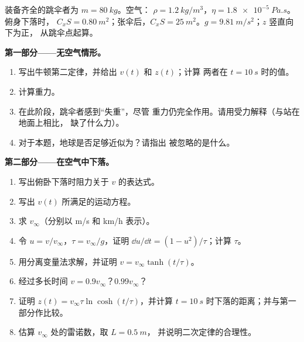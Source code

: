 \begin{problem}
\label{pb:b1:newton-dynamics:1}
装备齐全的跳伞者为 $m = \qty{80}{kg}$。空气：
$\rho = \qty{1.2}{kg/m^3}$，$\eta = \qty{1.8e-5}{Pa.s}$。俯身下落时，
$C_xS = \qty{0.80}{m^2}$；张伞后，$C_xS =
\qty{25}{m^2}$。$g = \qty{9.81}{m/s^2}$；$z$ 竖直向下为正，
从跳伞点起算。

\medskip
\noindent\textbf{第一部分——无空气情形。}
\begin{enumerate}
  \item 写出牛顿第二定律，并给出 $v(t)$ 和 $z(t)$；计算
        两者在 $t = \qty{10}{s}$ 时的值。
  \item 计算重力。
  \item 在此阶段，跳伞者感到“失重”，尽管
        重力仍完全作用。请用受力解释（与站在地面上相比，
        缺了什么力）。
  \item 对于本题，地球是否足够近似为？请指出
        被忽略的是什么。
\end{enumerate}

\medskip
\noindent\textbf{第二部分——在空气中下落。}
\begin{enumerate}[resume]
  \item 写出俯卧下落时阻力关于 $v$ 的表达式。
  \item 写出 $v(t)$ 所满足的运动方程。
  \item 求 $v_\infty$（分别以 \unit{m/s} 和
        \unit{km/h} 表示）。
  \item 令 $u = v/v_\infty$，$\tau = v_\infty/g$，证明
        $\dd u/\dd t = (1 - u^2)/\tau$；计算 $\tau$。
  \item 用分离变量法求解，并证明
        $v = v_\infty\tanh(t/\tau)$。
  \item 经过多长时间 $v = 0.9v_\infty$？$0.99v_\infty$？
  \item 证明 $z(t) = v_\infty\tau\ln\cosh(t/\tau)$，并计算
        $t = \qty{10}{s}$ 时下落的距离；并与第一部分作比较。
  \item 估算 $v_\infty$ 处的雷诺数，取 $L = \qty{0.5}{m}$，
        并说明二次定律的合理性。
\end{enumerate}


\end{problem}
